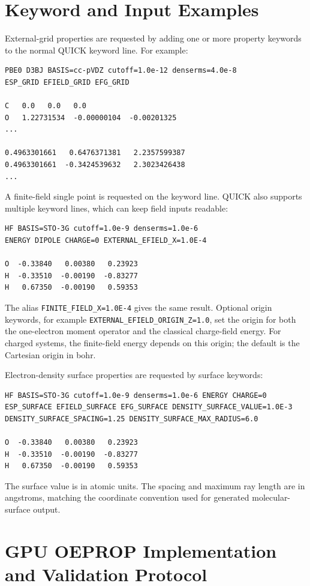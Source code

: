 \documentclass[journal=jcisd8,manuscript=suppinfo]{achemso}
\begin{document}
\section{Keyword and Input Examples}

External-grid properties are requested by adding one or more property keywords to the normal QUICK keyword line.  For example:
\begin{verbatim}
PBE0 D3BJ BASIS=cc-pVDZ cutoff=1.0e-12 denserms=4.0e-8
ESP_GRID EFIELD_GRID EFG_GRID

C   0.0   0.0   0.0
O   1.22731534  -0.00000104  -0.00201325
...

0.4963301661   0.6476371381   2.2357599387
0.4963301661  -0.3424539632   2.3023426438
...
\end{verbatim}

A finite-field single point is requested on the keyword line.  QUICK also supports multiple keyword lines, which can keep field inputs readable:
\begin{verbatim}
HF BASIS=STO-3G cutoff=1.0e-9 denserms=1.0e-6
ENERGY DIPOLE CHARGE=0 EXTERNAL_EFIELD_X=1.0E-4

O  -0.33840   0.00380   0.23923
H  -0.33510  -0.00190  -0.83277
H   0.67350  -0.00190   0.59353
\end{verbatim}

The alias \texttt{FINITE\_FIELD\_X=1.0E-4} gives the same result.  Optional origin keywords, for example \texttt{EXTERNAL\_EFIELD\_ORIGIN\_Z=1.0}, set the origin for both the one-electron moment operator and the classical charge-field energy.  For charged systems, the finite-field energy depends on this origin; the default is the Cartesian origin in bohr.

Electron-density surface properties are requested by surface keywords:
\begin{verbatim}
HF BASIS=STO-3G cutoff=1.0e-9 denserms=1.0e-6 ENERGY CHARGE=0
ESP_SURFACE EFIELD_SURFACE EFG_SURFACE DENSITY_SURFACE_VALUE=1.0E-3
DENSITY_SURFACE_SPACING=1.25 DENSITY_SURFACE_MAX_RADIUS=6.0

O  -0.33840   0.00380   0.23923
H  -0.33510  -0.00190  -0.83277
H   0.67350  -0.00190   0.59353
\end{verbatim}
The surface value is in atomic units.  The spacing and maximum ray length are in angstroms, matching the coordinate convention used for generated molecular-surface output.

\section{GPU OEPROP Implementation and Validation Protocol}
\end{document}
